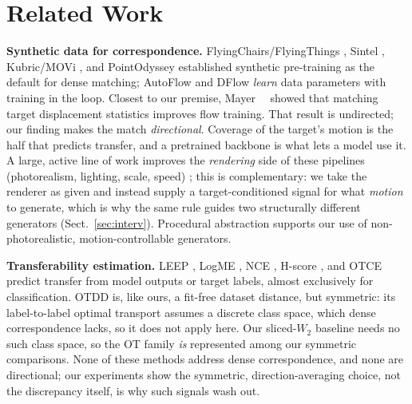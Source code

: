 \section{Related Work}
\label{sec:related}

\noindent\textbf{Synthetic data for correspondence.}
FlyingChairs/FlyingThings \cite{dosovitskiy2015Flownet-FlyingChairsDataset,mayer2016FlyingThingsDataset}, Sintel
\cite{sintel}, Kubric/MOVi \cite{greff2021kubric}, and PointOdyssey
\cite{pointodyssey} established synthetic pre-training as the default for
dense matching; AutoFlow \cite{sun2021autoflow} and DFlow \cite{im2022dflow}
\emph{learn} data parameters with training in the loop. Closest to our
premise, Mayer~\etal~\cite{mayer2018what} showed that matching target
displacement statistics improves flow training. That result is undirected;
our finding makes the match \emph{directional}. Coverage of the target's motion is
the half that predicts transfer, and a pretrained backbone is what lets a model use
it. A large, active
line of work improves the \emph{rendering} side of these pipelines (photorealism,
lighting, scale, speed) \cite{greff2021kubric,pointodyssey}; this is complementary:
we take the renderer as given and instead supply a target-conditioned signal for
what \emph{motion} to generate, which is why the same rule guides two structurally
different generators (Sect.~\ref{sec:interv}).
Procedural abstraction \cite{Baradad2021LookingAtNoise,Kataoka2020Pre-trainingImages,Anderson2022ImprovingFractal,white2009mandelbulb}
supports our use of non-photorealistic, motion-controllable generators.

\noindent\textbf{Transferability estimation.}
LEEP \cite{nguyen2020leep}, LogME \cite{you2021logme}, NCE
\cite{tran2019transferability}, H-score \cite{bao2019information}, and OTCE
\cite{tan2021otce} predict transfer from model outputs or target labels,
almost exclusively for classification. OTDD \cite{alvarez2020geometric} is,
like ours, a fit-free dataset distance, but symmetric: its label-to-label optimal
transport assumes a discrete class space, which dense correspondence lacks, so it
does not apply here. Our sliced-$W_2$ baseline needs no such class space, so the OT
family \emph{is} represented among our symmetric comparisons. None of these methods address dense
correspondence, and none are directional; our experiments show the symmetric,
direction-averaging choice, not the discrepancy itself, is why such signals wash
out.


